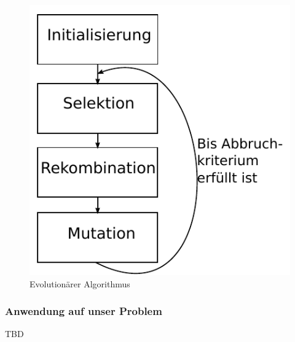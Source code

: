 \begin{figure}[h]
  \centering
  \includegraphics{images/evolutionaerer_algorithmus.pdf}
  \caption[Evolutionärer Algorithmus]{Evolutionärer Algorithmus}
  \label{fig:endlicher_automat}
\end{figure}

\subsubsection{Anwendung auf unser Problem}
TBD